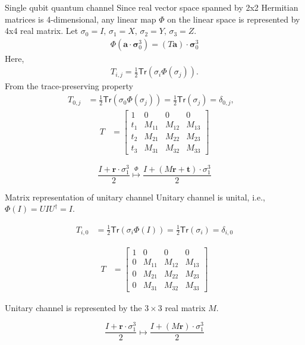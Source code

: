 \documentclass{beamer}
\newcommand{\Tr}{\mathsf{Tr}}
\newcommand\emm[1]{\textcolor{redorange}{{#1}}}
\newcommand\bm[1]{{\mathbf{#1}}}
\begin{document}
\begin{frame}{Single qubit quantum channel}
\small
Since real vector space spanned by 2x2 Hermitian matrices is 4-dimensional, any linear map $\Phi$ on the linear space
is represented by 4x4 real matrix.
Let $\sigma_0=I,\,\sigma_1=X,\,\sigma_2=Y,\,\sigma_3=Z$.
\begin{align*}
\Phi\left(\bm{a}\cdot \bm{\sigma}_0^3\right)
=
(T\bm{a})\cdot \bm{\sigma}_0^3
\end{align*}
Here,
\begin{align*}
T_{i,j} = \frac12\Tr(\sigma_i\Phi(\sigma_j)).
\end{align*}
From the trace-preserving property
\begin{align*}
T_{0,j} &= \frac12\Tr(\sigma_0\Phi(\sigma_j)) = \frac12\Tr(\sigma_j) = \delta_{0,j},&
\end{align*}
\begin{align*}
T &=
\begin{bmatrix}
1&0&0&0\\
t_1&M_{11}&M_{12}&M_{13}\\
t_2&M_{21}&M_{22}&M_{23}\\
t_3&M_{31}&M_{32}&M_{33}
\end{bmatrix}
\end{align*}

\vspace{1em}
\begin{equation*}
\frac{I+\mathbf{r}\cdot\sigma_1^3}2 \stackrel{\Phi}{\longmapsto}
\frac{I+(M\mathbf{r}+\mathbf{t})\cdot\sigma_1^3}2
\end{equation*}
\end{frame}

\begin{frame}{Matrix representation of unitary channel}
Unitary channel is \emm{unital}, i.e., $\Phi(I) = UIU^\dagger = I$.

\begin{align*}
T_{i,0} &= \frac12\Tr(\sigma_i\Phi(I)) = \frac12\Tr(\sigma_i) = \delta_{i,0}
\end{align*}

\begin{align*}
T &=
\begin{bmatrix}
1&0&0&0\\
0&M_{11}&M_{12}&M_{13}\\
0&M_{21}&M_{22}&M_{23}\\
0&M_{31}&M_{32}&M_{33}
\end{bmatrix}
\end{align*}

Unitary channel is represented by the $3\times 3$ real matrix $M$.

\begin{equation*}
\frac{I+\mathbf{r}\cdot\sigma_1^3}2 \longmapsto
\frac{I+(M\mathbf{r})\cdot\sigma_1^3}2
\end{equation*}
\end{frame}
\end{document}
